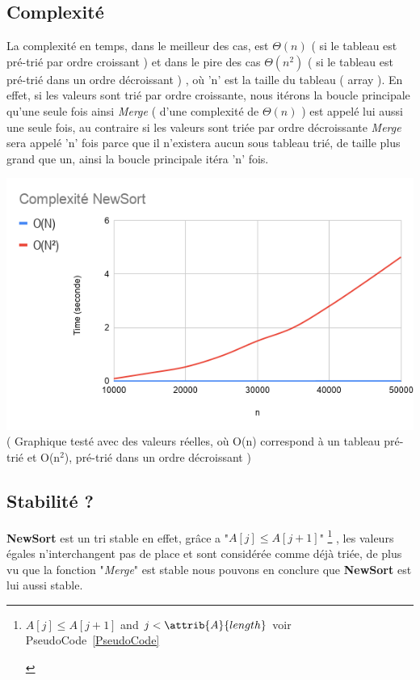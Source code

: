 \documentclass[a4paper, 11pt, oneside]{article}
\begin{document}
\subsection{Complexité}
La complexité en temps, dans le meilleur des cas, est $\Theta(n)$ ( si le tableau est pré-trié par ordre croissant ) et dans le pire des cas $\Theta(n^{2})$ ( si le tableau est pré-trié dans un ordre décroissant ) , où 'n' est la taille du tableau ( array ). En effet, si les valeurs sont trié par ordre croissante, nous itérons la boucle principale qu'une seule fois ainsi \textit{Merge} ( d'une complexité de $\Theta(n)$ ) est appelé lui aussi une seule fois, au contraire si  les valeurs sont triée par ordre décroissante \textit{Merge} sera appelé 'n' fois parce que il n'existera aucun sous tableau trié, de taille plus grand que un, ainsi la boucle principale itéra 'n' fois.     

\includegraphics[scale=0.6]{graphique.png} \\
( Graphique testé avec des valeurs réelles, où O(n) correspond à un tableau pré-trié et O(n$^{2}$), pré-trié dans un ordre décroissant ) 


\subsection{Stabilité ?}
\textbf{NewSort}
 est un tri stable en effet, grâce a "\textit{$A[j]\leq A[j+1]$}"
	\footnote{\begin{codebox}
	\While $A[j] \leq A[j+1]$ and $j < \attrib{A}{length}$
voir PseudoCode~\ref{PseudoCode}
\End
\end{codebox} }
, les valeurs égales n'interchangent pas de place et sont considérée comme déjà triée, de plus vu que la fonction "\textit{Merge}" est stable nous pouvons en conclure que \textbf{NewSort} est lui aussi stable. 
\end{document}
